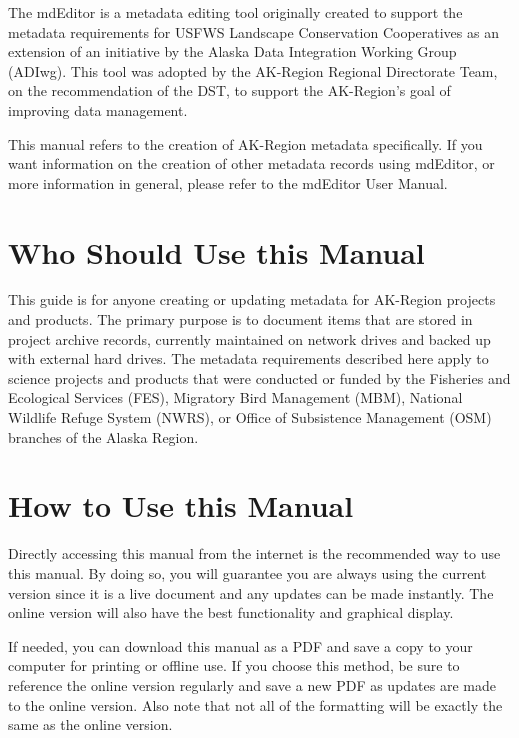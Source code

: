 \documentclass[
]{book}
\begin{document}
The mdEditor is a metadata editing tool originally created to support the metadata requirements for USFWS Landscape Conservation Cooperatives as an extension of an initiative by the Alaska Data Integration Working Group (ADIwg). This tool was adopted by the AK-Region Regional Directorate Team, on the recommendation of the DST, to support the AK-Region's goal of improving data management.

This manual refers to the creation of AK-Region metadata specifically. If you want information on the creation of other metadata records using mdEditor, or more information in general, please refer to the mdEditor User Manual.

\hypertarget{who-should-use-this-manual}{%
\section*{Who Should Use this Manual}\label{who-should-use-this-manual}}

This guide is for anyone creating or updating metadata for AK-Region projects and products. The primary purpose is to document items that are stored in project archive records, currently maintained on network drives and backed up with external hard drives.
The metadata requirements described here apply to science projects and products that were conducted or funded by the Fisheries and Ecological Services (FES), Migratory Bird Management (MBM), National Wildlife Refuge System (NWRS), or Office of Subsistence Management (OSM) branches of the Alaska Region.

\hypertarget{how-to-use-this-manual}{%
\section*{How to Use this Manual}\label{how-to-use-this-manual}}

Directly accessing this manual from the internet is the recommended way to use this manual. By doing so, you will guarantee you are always using the current version since it is a live document and any updates can be made instantly. The online version will also have the best functionality and graphical display.

If needed, you can download this manual as a PDF and save a copy to your computer for printing or offline use. If you choose this method, be sure to reference the online version regularly and save a new PDF as updates are made to the online version. Also note that not all of the formatting will be exactly the same as the online version.
\end{document}
